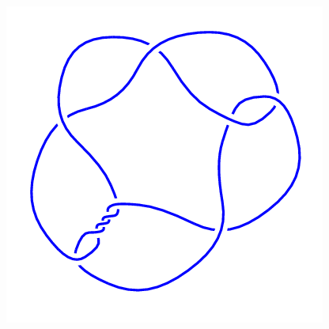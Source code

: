 \begin{figure}[H]
\begin{minipage}[b]{.18\linewidth}
	\end{minipage}
	\begin{minipage}[b]{.18\linewidth}
		\centering
		\includegraphics[width=\linewidth]{../data/10_6.png}
	\end{minipage}
\end{figure}
